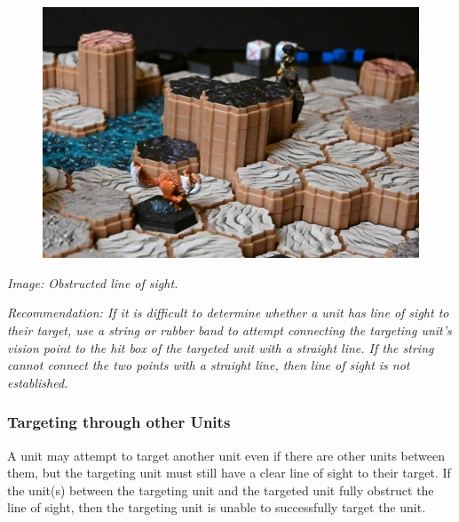 \documentclass[../main.tex]{subfiles}
\begin{document}
\begin{figure}[h]
    \centering
    \includegraphics[width=1\linewidth]{chapters//TargetingandCombat/TimeStrikenotlineofsight.jpg}
\end{figure}
\textit{Image: Obstructed line of sight.}

\textit{Recommendation: If it is difficult to determine whether a unit has line of sight to their target, use a string or rubber band to attempt connecting the targeting unit’s vision point to the hit box of the targeted unit with a straight line. If the string cannot connect the two points with a straight line, then line of sight is not established.}



\subsubsection{Targeting through other Units}

A unit may attempt to target another unit even if there are other units between them, but the targeting unit must still have a clear line of sight to their target. If the unit(s) between the targeting unit and the targeted unit fully obstruct the line of sight, then the targeting unit is unable to successfully target the unit.
\end{document}
